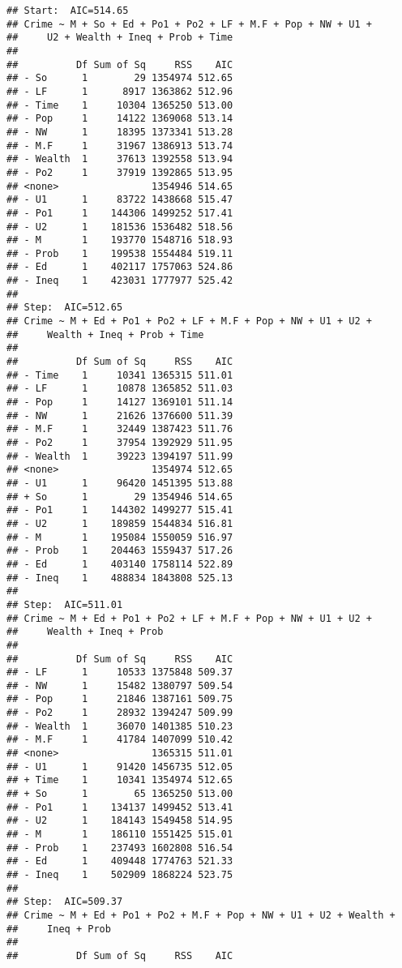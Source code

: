 \documentclass[
]{article}
\begin{document}
\begin{verbatim}
## Start:  AIC=514.65
## Crime ~ M + So + Ed + Po1 + Po2 + LF + M.F + Pop + NW + U1 + 
##     U2 + Wealth + Ineq + Prob + Time
## 
##          Df Sum of Sq     RSS    AIC
## - So      1        29 1354974 512.65
## - LF      1      8917 1363862 512.96
## - Time    1     10304 1365250 513.00
## - Pop     1     14122 1369068 513.14
## - NW      1     18395 1373341 513.28
## - M.F     1     31967 1386913 513.74
## - Wealth  1     37613 1392558 513.94
## - Po2     1     37919 1392865 513.95
## <none>                1354946 514.65
## - U1      1     83722 1438668 515.47
## - Po1     1    144306 1499252 517.41
## - U2      1    181536 1536482 518.56
## - M       1    193770 1548716 518.93
## - Prob    1    199538 1554484 519.11
## - Ed      1    402117 1757063 524.86
## - Ineq    1    423031 1777977 525.42
## 
## Step:  AIC=512.65
## Crime ~ M + Ed + Po1 + Po2 + LF + M.F + Pop + NW + U1 + U2 + 
##     Wealth + Ineq + Prob + Time
## 
##          Df Sum of Sq     RSS    AIC
## - Time    1     10341 1365315 511.01
## - LF      1     10878 1365852 511.03
## - Pop     1     14127 1369101 511.14
## - NW      1     21626 1376600 511.39
## - M.F     1     32449 1387423 511.76
## - Po2     1     37954 1392929 511.95
## - Wealth  1     39223 1394197 511.99
## <none>                1354974 512.65
## - U1      1     96420 1451395 513.88
## + So      1        29 1354946 514.65
## - Po1     1    144302 1499277 515.41
## - U2      1    189859 1544834 516.81
## - M       1    195084 1550059 516.97
## - Prob    1    204463 1559437 517.26
## - Ed      1    403140 1758114 522.89
## - Ineq    1    488834 1843808 525.13
## 
## Step:  AIC=511.01
## Crime ~ M + Ed + Po1 + Po2 + LF + M.F + Pop + NW + U1 + U2 + 
##     Wealth + Ineq + Prob
## 
##          Df Sum of Sq     RSS    AIC
## - LF      1     10533 1375848 509.37
## - NW      1     15482 1380797 509.54
## - Pop     1     21846 1387161 509.75
## - Po2     1     28932 1394247 509.99
## - Wealth  1     36070 1401385 510.23
## - M.F     1     41784 1407099 510.42
## <none>                1365315 511.01
## - U1      1     91420 1456735 512.05
## + Time    1     10341 1354974 512.65
## + So      1        65 1365250 513.00
## - Po1     1    134137 1499452 513.41
## - U2      1    184143 1549458 514.95
## - M       1    186110 1551425 515.01
## - Prob    1    237493 1602808 516.54
## - Ed      1    409448 1774763 521.33
## - Ineq    1    502909 1868224 523.75
## 
## Step:  AIC=509.37
## Crime ~ M + Ed + Po1 + Po2 + M.F + Pop + NW + U1 + U2 + Wealth + 
##     Ineq + Prob
## 
##          Df Sum of Sq     RSS    AIC

\end{verbatim}
\end{document}
